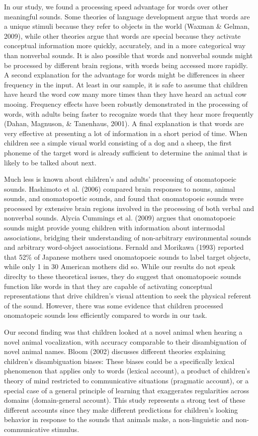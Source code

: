 \documentclass[english,floatsintext,man]{apa6}
\theoremstyle{definition}
\theoremstyle{definition}
\theoremstyle{definition}
\theoremstyle{remark}
\begin{document}
In our study, we found a processing speed advantage for words over other
meaningful sounds. Some theories of language development argue that
words are a unique stimuli because they refer to objects in the world
(Waxman \& Gelman, 2009), while other theories argue that words are
special because they activate conceptual information more quickly,
accurately, and in a more categorical way than nonverbal sounds. It is
also possible that words and nonverbal sounds might be processed by
different brain regions, with words being accessed more rapidly. A
second explanation for the advantage for words might be differences in
sheer frequency in the input. At least in our sample, it is safe to
assume that children have heard the word cow many more times than they
have heard an actual cow mooing. Frequency effects have been robustly
demonstrated in the processing of words, with adults being faster to
recognize words that they hear more frequently (Dahan, Magnuson, \&
Tanenhaus, 2001). A final explanation is that words are very effective
at presenting a lot of information in a short period of time. When
children see a simple visual world consisting of a dog and a sheep, the
first phoneme of the target word is already sufficient to determine the
animal that is likely to be talked about next.

Much less is known about children's and adults' processing of
onomatopoeic sounds. Hashimoto et al. (2006) compared brain responses to
nouns, animal sounds, and onomatopoetic sounds, and found that
onomatopoeic sounds were processed by extensive brain regions involved
in the processing of both verbal and nonverbal sounds. Alycia Cummings
et al. (2009) argues that onomatopoeic sounds might provide young
children with information about intermodal associations, bridging their
understanding of non-arbitrary environmental sounds and arbitrary
word-object associations. Fernald and Morikawa (1993) reported that 52\%
of Japanese mothers used onomatopoeic sounds to label target objects,
while only 1 in 30 American mothers did so. While our results do not
speak direclty to these theoretical issues, they do suggest that
onomatopoeic sounds function like words in that they are capable of
activating conceptual representations that drive children's visual
attention to seek the physical referent of the sound. However, there was
some evidence that children processed onomatopeic sounds less
efficiently compared to words in our task.

Our second finding was that children looked at a novel animal when
hearing a novel animal vocalization, with accuracy comparable to their
disambiguation of novel animal names. Bloom (2002) discusses different
theories explaining children's disambiguation biases: These biases could
be a specifically lexical phenomenon that applies only to words (lexical
account), a product of children's theory of mind restricted to
communicative situations (pragmatic account), or a special case of a
general principle of learning that exaggerates regularities across
domains (domain-general account). This study represents a strong test of
these different accounts since they make different predictions for
children's looking behavior in response to the sounds that animals make,
a non-linguistic and non-communicative stimulus.
\end{document}
